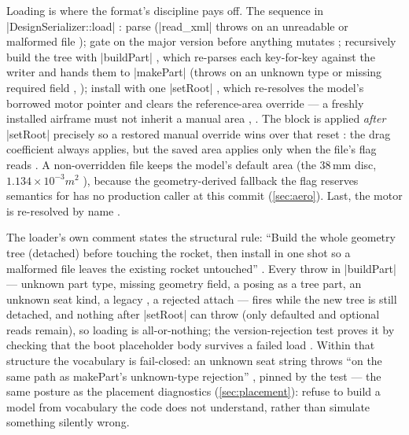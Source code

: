 Loading is where the format's discipline pays off. The sequence in
\cppinline|DesignSerializer::load| : parse
(\cppinline|read_xml| throws on an unreadable or malformed file
); gate on the major version before anything mutates
; recursively build the tree with
\cppinline|buildPart| , which re-parses each
 key-for-key against the writer  and
hands them to \cppinline|makePart| (throws on an unknown type or missing required field
, ); install
with one \cppinline|setRoot| , which re-resolves the
model's borrowed motor pointer and clears the reference-area override --- a freshly
installed airframe must not inherit a manual area ,
. The  block is applied \emph{after}
\cppinline|setRoot| precisely so a restored manual override wins over that reset
: the drag coefficient always applies, but the saved
area applies only when the file's flag reads 
. A non-overridden file keeps the model's default
area (the 38\,mm disc, $1.134\times10^{-3}\unit{m^2}$ ),
because the geometry-derived fallback the flag reserves semantics for has no production
caller at this commit (\cref{sec:aero}). Last, the motor is re-resolved by name
.

\begin{designrule}
The loader's own comment states the structural rule: ``Build the whole geometry tree
(detached) before touching the rocket, then install in one shot so a malformed file
leaves the existing rocket untouched'' . Every throw
in \cppinline|buildPart| --- unknown part type, missing geometry field, a 
posing as a tree part, an unknown seat kind, a legacy , a rejected attach
--- fires while the new tree is still detached, and nothing after \cppinline|setRoot| can
throw (only defaulted and optional reads remain), so loading is all-or-nothing; the
version-rejection test proves it by checking that the boot placeholder body survives a
failed load . Within that structure the
vocabulary is fail-closed: an unknown seat string throws ``on the same path as makePart's
unknown-type rejection'' , pinned by the
 test  --- the same posture
as the placement diagnostics (\cref{sec:placement}): refuse to build a model from
vocabulary the code does not understand, rather than simulate something silently wrong.
\end{designrule}

